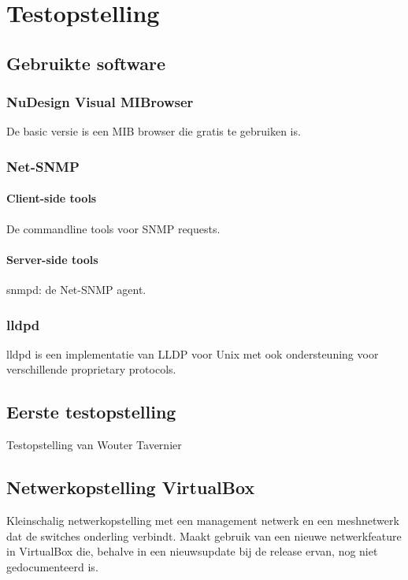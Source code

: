 \chapter{Testopstelling}


\section{Gebruikte software}

\subsection{NuDesign Visual MIBrowser}
De basic versie is een MIB browser die gratis te gebruiken is.

\subsection{Net-SNMP}

\subsubsection{Client-side tools}
De commandline tools voor SNMP requests.

\subsubsection{Server-side tools}
snmpd: de Net-SNMP agent.

\subsection{lldpd}
lldpd is een implementatie van LLDP voor Unix met ook ondersteuning voor verschillende proprietary protocols.


\section{Eerste testopstelling}
Testopstelling van Wouter Tavernier

\section{Netwerkopstelling VirtualBox}
Kleinschalig netwerkopstelling met een management netwerk en een meshnetwerk dat de switches onderling verbindt.
Maakt gebruik van een nieuwe netwerkfeature in VirtualBox die, behalve in een nieuwsupdate bij de release ervan, nog niet gedocumenteerd is.

